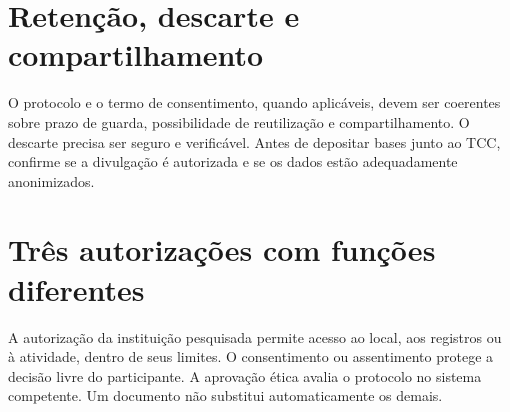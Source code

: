 \section{Retenção, descarte e compartilhamento}

O protocolo e o termo de consentimento, quando aplicáveis, devem ser coerentes sobre prazo de guarda, possibilidade de reutilização e compartilhamento. O descarte precisa ser seguro e verificável. Antes de depositar bases junto ao TCC, confirme se a divulgação é autorizada e se os dados estão adequadamente anonimizados.

\section{Três autorizações com funções diferentes}

A autorização da instituição pesquisada permite acesso ao local, aos registros ou à atividade, dentro de seus limites. O consentimento ou assentimento protege a decisão livre do participante. A aprovação ética avalia o protocolo no sistema competente. Um documento não substitui automaticamente os demais.
